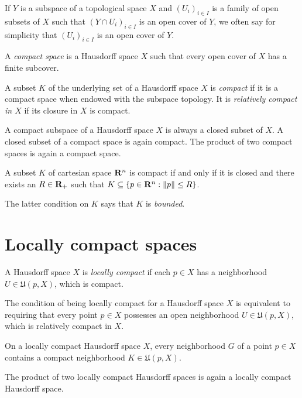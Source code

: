 If $Y$ is a subspace of a topological space $X$ and $(U_i)_{i \in I}$ is a family
of open subsets of $X$ such that $(Y \cap U_i)_{i \in I}$ is an open cover of
$Y$, we often say for simplicity that $(U_i)_{i \in I}$ is an open cover of $Y$.

\begin{dfn}
  A \emph{compact space} is a Hausdorff space $X$ such that every open cover of
  $X$ has a finite subcover.
\end{dfn}

A subset $K$ of the underlying set of a Hausdorff space $X$ is \emph{compact}
if it is a compact space when endowed with the subspace topology. It is \emph{relatively
compact in $X$} if its closure in $X$ is compact.

A compact subspace of a Hausdorff space $X$ is always a closed subset of $X$. A closed
subset of a compact space is again compact. The product of two compact spaces
is again a compact space.

\begin{thm}
  A subset $K$ of cartesian space $\mathbf{R}^n$ is compact if and only if it is closed
  and there exists an $R \in \mathbf{R}_+$ such that $K \subseteq \lbrace p \in \mathbf{R}^n : \lVert p\rVert \leq R\rbrace$.
\end{thm}

The latter condition on $K$ says that $K$ is \emph{bounded}.

\section{Locally compact spaces}
\label{sec:locally_compact}

\begin{dfn}
  A Hausdorff space $X$ is \emph{locally compact} if each $p \in X$ has a
  neighborhood $U \in \mathfrak U(p, X)$, which is compact.
\end{dfn}
The condition of being locally compact for a Hausdorff space $X$ is equivalent to
requiring that every point $p \in X$ possesses an open neighborhood $U \in \mathfrak U(p, X)$,
which is relatively compact in $X$.

\begin{prop}
  \label{prop:locally_compact}
  On a locally compact Hausdorff space $X$, every neighborhood $G$ of a point $p \in X$
  contains a compact neighborhood $K \in \mathfrak U(p, X)$.
\end{prop}

The product of two locally compact Hausdorff spaces is again a locally compact
Hausdorff space.

